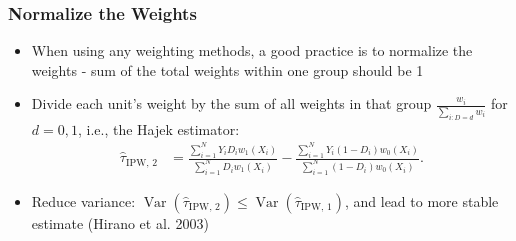 \documentclass[10pt, handout]{beamer}
\DeclareMathOperator*{\Var}{Var}
\begin{document}
    \begin{frame}
      \frametitle{Normalize the Weights}

      \begin{itemize}
        \item When using any weighting methods, a good practice is to normalize the weights - sum of the total weights within one group should be 1
        \item Divide each unit's weight by the sum of all weights in that group $\frac{w_i}{\sum_{i: D = d} w_i}$ for $d = 0, 1$, i.e., the Hajek estimator:
        \begin{align*}
          \hat{\tau}_{\text{IPW, 2}} &= \frac{\sum_{i = 1}^N Y_i D_i w_1(X_i)}{\sum_{i = 1}^N D_i w_1(X_i)} - \frac{\sum_{i = 1}^N Y_i (1 - D_i) w_0(X_i)}{\sum_{i = 1}^N (1 - D_i) w_0(X_i)}.
        \end{align*}
        \item Reduce variance: $\Var \left( \hat{\tau}_{\text{IPW, 2}} \right) \leq \Var \left( \hat{\tau}_{\text{IPW, 1}} \right)$, and lead to more stable estimate (Hirano et al. 2003)
      \end{itemize}

      

    \end{frame}
\end{document}
